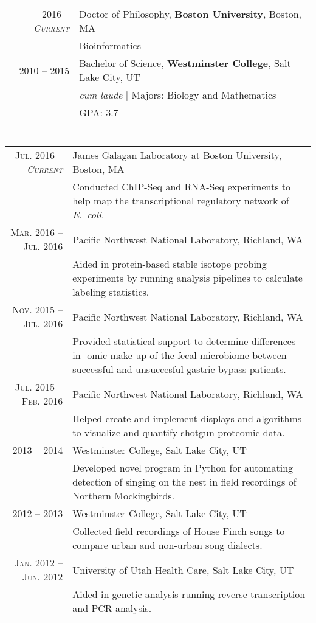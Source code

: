 \documentclass[a4paper,10pt]{article}
\begin{document}
\section{\color{linkcolour}{Education}}
\begin{tabular}{rl}
\textsc{2016 -- \emph{Current}} & Doctor of Philosophy, \textbf{Boston University}, Boston, MA \\
& Bioinformatics \\

 \textsc{2010 -- 2015} & Bachelor of Science, \textbf{Westminster College}, Salt Lake City, UT\\
& \small\emph{cum laude} | Majors: Biology and Mathematics\\
&\normalsize \textsc{GPA}: 3.7
\end{tabular}

\section{\color{linkcolour}{Research}}
\begin{tabular}{rp{10cm}}
\textsc{Jul. 2016 -- \emph{Current}} & James Galagan Laboratory at Boston University, Boston, MA \\
& \footnotesize{Conducted ChIP-Seq and RNA-Seq experiments to help map the transcriptional
	regulatory network of \emph{E.\ coli}.} \\
\textsc{Mar. 2016 -- Jul. 2016} & Pacific Northwest National Laboratory, Richland, WA \\
& \footnotesize{Aided in protein-based stable isotope probing experiments by running analysis pipelines to  calculate labeling statistics.} \\
\textsc{Nov. 2015 -- Jul. 2016} & Pacific Northwest National Laboratory, Richland, WA \\
& \footnotesize{Provided statistical support to determine differences in -omic make-up of the fecal microbiome between successful and unsuccesful gastric bypass patients.} \\
\textsc{Jul. 2015 -- Feb. 2016} & Pacific Northwest National Laboratory, Richland, WA \\
& \footnotesize{Helped create and implement displays and algorithms to visualize and quantify shotgun proteomic data.} \\
 \textsc{2013 -- 2014} & Westminster College, Salt Lake City, UT\\
& \footnotesize{Developed novel program in Python for automating detection of singing on the nest in field recordings of Northern Mockingbirds.}\\
\textsc{2012 -- 2013} & Westminster College, Salt Lake City, UT\\
& \footnotesize{Collected field recordings of House Finch songs to compare urban and non-urban song dialects.}\\
\textsc{Jan. 2012 -- Jun. 2012} & University of Utah Health Care, Salt Lake City, UT
\\& \footnotesize{Aided in genetic analysis running reverse transcription and PCR analysis.}
\end{tabular}
\end{document}
